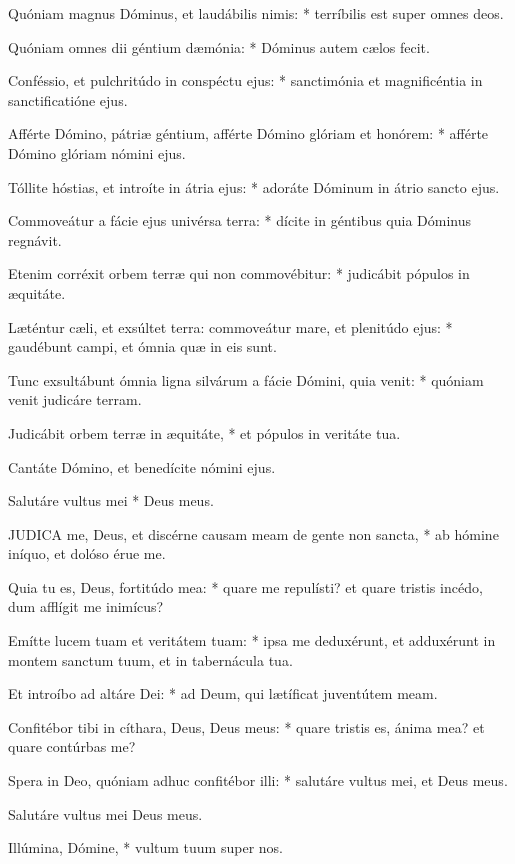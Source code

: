 Quóniam magnus Dóminus, et laudábilis nimis: * terríbilis est super omnes deos.

Quóniam omnes dii géntium dæmónia: * Dóminus autem cælos fecit.

Conféssio, et pulchritúdo in conspéctu ejus: * sanctimónia et magnificéntia in sanctificatióne ejus.

Afférte Dómino, pátriæ géntium, afférte Dómino glóriam et honórem: * afférte Dómino glóriam nómini ejus.

Tóllite hóstias, et introíte in átria ejus: * adoráte Dóminum in átrio sancto ejus.

Commoveátur a fácie ejus univérsa terra: * dícite in géntibus quia Dóminus regnávit.

Etenim corréxit orbem terræ qui non commovébitur: * judicábit pópulos in æquitáte.

Læténtur cæli, et exsúltet terra: commoveátur mare, et plenitúdo ejus: * gaudébunt campi, et ómnia quæ in eis sunt.

Tunc exsultábunt ómnia ligna silvárum a fácie Dómini, quia venit: * quóniam venit judicáre terram.

Judicábit orbem terræ in æquitáte, * et pópulos in veritáte tua.

 Cantáte Dómino, et benedícite nómini ejus.

 Salutáre vultus mei * Deus meus.


\lettrine[lines=2]{J}{UDICA} me, Deus, et discérne causam meam de gente non sancta, * ab hómine iníquo, et dolóso érue me.

Quia tu es, Deus, fortitúdo mea: * quare me repulísti? et quare tristis incédo, dum afflígit me inimícus?

Emítte lucem tuam et veritátem tuam: * ipsa me deduxérunt, et adduxérunt in montem sanctum tuum, et in tabernácula tua.

Et introíbo ad altáre Dei: * ad Deum, qui lætíficat juventútem meam.

Confitébor tibi in cíthara, Deus, Deus meus: * quare tristis es, ánima mea? et quare contúrbas me?

Spera in Deo, quóniam adhuc confitébor illi: * salutáre vultus mei, et Deus meus.

 Salutáre vultus mei Deus meus.

 Illúmina, Dómine, * vultum tuum super nos.



